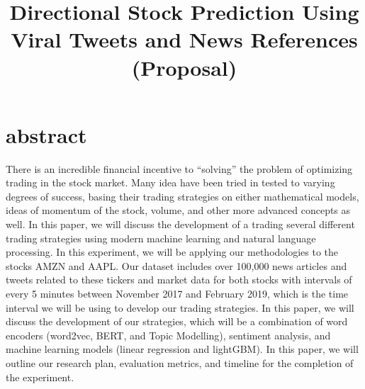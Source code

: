 \documentclass[conference]{IEEEtran}
\begin{document}
\title{Directional Stock Prediction Using Viral Tweets and News References (Proposal)\\
}

\author{
\and
{}
\and
{}
\and
{}
\and
{}
}

\maketitle

\section{abstract}
There is an incredible financial incentive to “solving” the problem of optimizing trading in the stock market. Many idea have been tried in tested to varying degrees of success, basing their trading strategies on either mathematical models, ideas of momentum of the stock, volume, and other more advanced concepts as well. In this paper, we will discuss the development of a trading several different trading strategies using modern machine learning and natural language processing. In this experiment, we will be applying our methodologies to the stocks AMZN and AAPL. Our dataset includes over 100,000 news articles and tweets related to these tickers and market data for both stocks with intervals of every 5 minutes between November 2017 and February 2019, which is the time interval we will be using to develop our trading strategies. In this paper, we will discuss the development of our strategies, which will be a combination of word encoders (word2vec, BERT, and Topic Modelling), sentiment analysis, and machine learning models (linear regression and lightGBM). In this paper, we will outline our research plan, evaluation metrics, and timeline for the completion of the experiment. 
\end{document}
